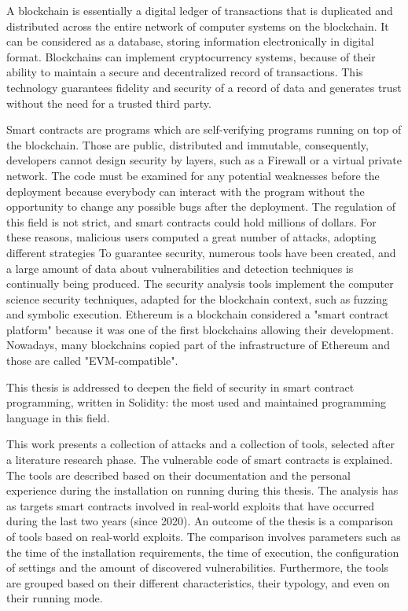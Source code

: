 
\Abstract
A blockchain is essentially a digital ledger of transactions that is duplicated and distributed across the entire network of computer systems on the blockchain.  It can be considered as a database, storing information electronically in digital format. Blockchains can implement cryptocurrency systems, because of their ability to maintain a secure and decentralized record of transactions. This technology guarantees fidelity and 
security of a record of data and generates trust without the need for a trusted third party.

Smart contracts are programs which are self-verifying programs running on top of the blockchain.
Those are public, distributed and immutable, consequently, developers cannot design security by layers, such as a Firewall or a virtual private network.
The code must be examined for any potential weaknesses before the deployment because everybody can interact with the program without the opportunity to change any possible bugs after the deployment.
The regulation of this field is not strict, and smart contracts could hold millions of dollars.
For these reasons, malicious users computed a great number of attacks, adopting different strategies
To guarantee security, numerous tools have been created, and a large amount of data about vulnerabilities and detection techniques is continually being produced.
The security analysis tools implement the computer science security techniques, adapted for the blockchain context, such as fuzzing and symbolic execution.
Ethereum is a blockchain considered a "smart contract platform" because it was one of the first blockchains allowing their development. Nowadays, many blockchains copied part of the infrastructure of Ethereum and those are called "EVM-compatible". 

This thesis is addressed to deepen the field of security in smart contract programming, written in Solidity: 
the most used and maintained programming language in this field.

This work presents a collection of attacks and a collection of tools, selected after a literature research phase. 
The vulnerable code of smart contracts is explained.  The tools are described based on their documentation and the personal experience during the installation on running during this thesis.
The analysis has as targets smart contracts involved in real-world exploits that have occurred during the last two years (since 2020). 
An outcome of the thesis is a comparison of tools based on real-world exploits.
The comparison involves parameters such as the time of the installation requirements, the time of execution, the configuration of settings and the amount of discovered vulnerabilities.
Furthermore, the tools are grouped based on their different characteristics, their typology, and even on their running mode. 

